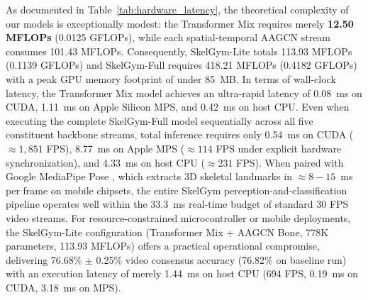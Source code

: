 \documentclass[preprint,12pt]{elsarticle}
\begin{document}
As documented in Table~\ref{tab:hardware_latency}, the theoretical complexity of our models is exceptionally modest: the Transformer Mix requires merely \textbf{12.50 MFLOPs} (0.0125 GFLOPs), while each spatial-temporal AAGCN stream consumes 101.43 MFLOPs. Consequently, SkelGym-Lite totals 113.93 MFLOPs (0.1139 GFLOPs) and SkelGym-Full requires 418.21 MFLOPs (0.4182 GFLOPs) with a peak GPU memory footprint of under 85~MB.
In terms of wall-clock latency, the Transformer Mix model achieves an ultra-rapid latency of 0.08~ms on CUDA, 1.11~ms on Apple Silicon MPS, and 0.42~ms on host CPU. Even when executing the complete SkelGym-Full model sequentially across all five constituent backbone streams, total inference requires only 0.54~ms on CUDA ($\approx 1,851$ FPS), 8.77~ms on Apple MPS ($\approx 114$ FPS under explicit hardware synchronization), and 4.33~ms on host CPU ($\approx 231$ FPS). When paired with Google MediaPipe Pose \cite{chuankun2019,bazarevsky2020}, which extracts 3D skeletal landmarks in $\approx 8-15$~ms per frame on mobile chipsets, the entire SkelGym perception-and-classification pipeline operates well within the 33.3~ms real-time budget of standard 30 FPS video streams. For resource-constrained microcontroller or mobile deployments, the SkelGym-Lite configuration (Transformer Mix + AAGCN Bone, 778K parameters, 113.93 MFLOPs) offers a practical operational compromise, delivering 76.68\% $\pm$ 0.25\% video consensus accuracy (76.82\% on baseline run) with an execution latency of merely 1.44~ms on host CPU (694 FPS, 0.19~ms on CUDA, 3.18~ms on MPS).
\end{document}
